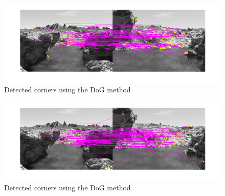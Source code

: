 \documentclass{article}
\begin{document}
\begin{figure}[ht]
\centering
\includegraphics[width=\textwidth]{img/matchesLaplace.png}
\caption{Detected corners using the DoG method}
\label{fig:matching}
\end{figure}

\begin{figure}[ht]
\centering
\includegraphics[width=\textwidth]{img/matchesDoG.png}
\caption{Detected corners using the DoG method}
\label{fig:matDoG}
\end{figure}

{}

\end{document}
